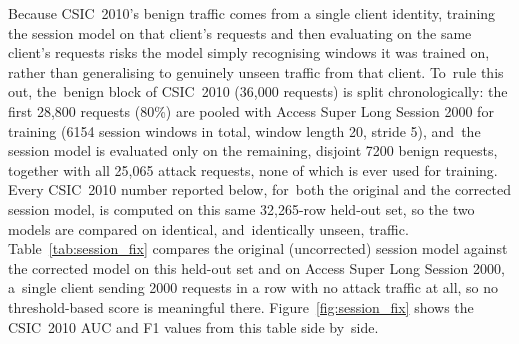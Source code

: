 \documentclass[futureinternet,article,accept,moreauthors]{Definitions/mdpi}
\begin{document}
Because CSIC~2010's benign traffic comes from a single client identity, training the session model on that client's requests and then evaluating on the same client's requests risks the model simply recognising windows it was trained on, rather than generalising to genuinely unseen traffic from that client. To~rule this out, the~benign block of CSIC~2010 (36{,}000 requests) is split chronologically: the first 28{,}800 requests (80\%) are pooled with Access Super Long Session 2000 for training (6154 session windows in total, window length 20, stride 5), and~the session model is evaluated only on the remaining, disjoint 7200 benign requests, together with all 25{,}065 attack requests, none of which is ever used for training. Every CSIC~2010 number reported below, for~both the original and the corrected session model, is computed on this same 32{,}265-row held-out set, so the two models are compared on identical, and~identically unseen, traffic. Table~\ref{tab:session_fix} compares the original (uncorrected) session model against the corrected model on this held-out set and on Access Super Long Session 2000, a~single client sending 2000 requests in a row with no attack traffic at all, so no threshold-based score is meaningful there. Figure~\ref{fig:session_fix} shows the CSIC~2010 AUC and F1 values from this table side by~side.
\end{document}
